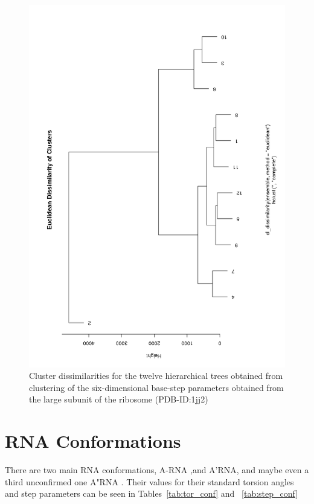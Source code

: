 \begin{figure}[htbp]
\centering
\includegraphics[scale=0.60]{Chapter2/clussdissim.png}
\caption{Cluster dissimilarities for the twelve hierarchical trees
  obtained from clustering of the six-dimensional base-step parameters
obtained from the large subunit of the ribosome (PDB-ID:1jj2)}
\label{fig:clusdis}
\end{figure}


\section{RNA Conformations}
There are two main RNA conformations, A-RNA ,and A'RNA, and maybe even a
third unconfirmed one A"RNA \cite{saenger1984}.
Their values for their standard torsion angles and step parameters can be seen
in Tables~\ref{tab:tor_conf} and ~\ref{tab:step_conf} 

